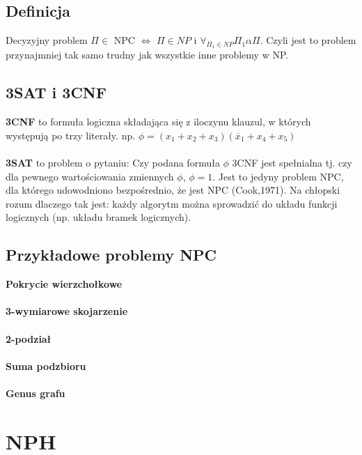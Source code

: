 \documentclass{article}
\begin{document}
\subsection{Definicja}
Decyzyjny problem $\Pi \in$ NPC $\iff$ $\Pi \in NP$ i $\forall_{\Pi_1 \in NP} \Pi_1 \alpha \Pi$. Czyli jest to problem
przynajmniej tak samo trudny jak wszystkie inne problemy w NP.

\subsection{3SAT i 3CNF}
\textbf{3CNF} to formuła logiczna składająca się z iloczynu klauzul, w których występują po trzy literały.
np. $\phi = (x_1 + x_2 + x_3)(\overline{x}_1 + x_4 + x_5)$ \\\\
\textbf{3SAT} to problem o pytaniu: Czy podana formuła $\phi$ 3CNF jest spełnialna tj. czy dla pewnego wartościowania zmiennych $\phi$, $\phi = 1$. Jest to jedyny problem NPC,  dla którego udowodniono bezpośrednio, 
że jest NPC (Cook,1971). Na chłopski rozum dlaczego tak jest: każdy algorytm można sprowadzić do
układu funkcji logicznych (np. układu bramek logicznych).
 
\subsection{Przykładowe problemy NPC}
\textbf{Pokrycie wierzchołkowe} \\\\
\textbf{3-wymiarowe skojarzenie} \\\\
\textbf{2-podział} \\\\
\textbf{Suma podzbioru} \\\\
\textbf{Genus grafu}

\section{NPH}
\end{document}
